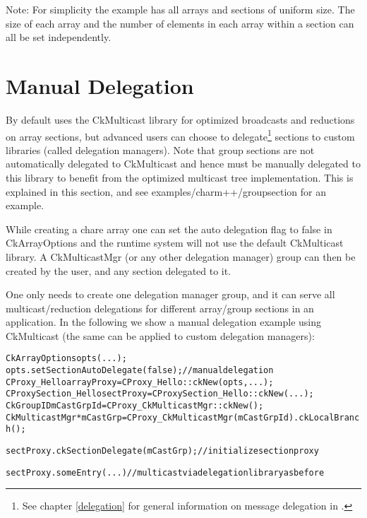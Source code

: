 Note: For simplicity the example has all arrays and sections of uniform
size.  The size of each array and the number of elements in each array
within a section can all be set independently.




\section{Manual Delegation}
\label{Manual Delegation}

By default \charmpp{} uses the CkMulticast library for optimized broadcasts and
reductions on array sections, but advanced \charmpp{} users can choose to
delegate\footnote{See chapter \ref{delegation} for general information on message delegation in \charmpp{}.}
sections to custom libraries (called delegation managers).
Note that group sections are not automatically
delegated to CkMulticast and hence must be manually delegated to this library
to benefit from the optimized multicast tree implementation.
This is explained in this section, and see examples/charm++/groupsection for an example.

While creating a chare array one can set the auto delegation flag to
false in CkArrayOptions and the runtime system will not use the default CkMulticast library.
A CkMulticastMgr (or any other delegation manager) group can then be created by the user, and any
section delegated to it.

One only needs to create one delegation manager group, and it
can serve all multicast/reduction delegations for different array/group sections in an application.
In the following we show a manual delegation example using CkMulticast (the same can be applied
to custom delegation managers):

\begin{alltt}
  CkArrayOptions opts(...);
  opts.setSectionAutoDelegate(false); // manual delegation
  CProxy_Hello arrayProxy = CProxy_Hello::ckNew(opts,...);
  CProxySection_Hello sectProxy = CProxySection_Hello::ckNew(...);
  CkGroupID mCastGrpId = CProxy_CkMulticastMgr::ckNew();
  CkMulticastMgr *mCastGrp = CProxy_CkMulticastMgr(mCastGrpId).ckLocalBranch();

  sectProxy.ckSectionDelegate(mCastGrp);  // initialize section proxy

  sectProxy.someEntry(...)           // multicast via delegation library as before

\end{alltt}

